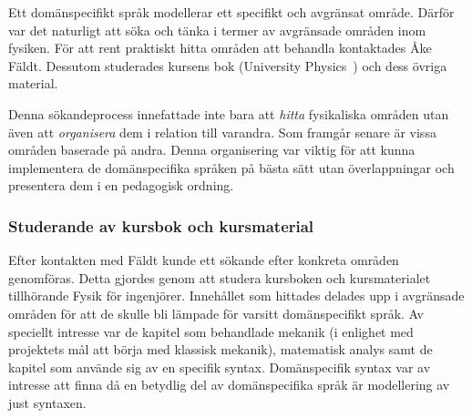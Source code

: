 Ett domänspecifikt språk modellerar ett specifikt och avgränsat område. Därför
var det naturligt att söka och tänka i termer av avgränsade områden inom
fysiken.
För att rent praktiskt hitta områden att behandla kontaktades Åke
Fäldt. Dessutom studerades kursens bok (University
Physics~\cite{UP}) och dess övriga material.

Denna sökandeprocess innefattade inte bara att \textit{hitta} fysikaliska
områden utan även att \textit{organisera} dem i relation till varandra. Som framgår
senare är vissa områden baserade på andra. Denna organisering
var viktig för att kunna implementera de domänspecifika språken på bästa sätt
utan överlappningar och presentera dem i en pedagogisk ordning.

%
%

\subsubsection*{Studerande av kursbok och kursmaterial}

Efter kontakten med Fäldt kunde ett sökande efter konkreta områden genomföras.
Detta gjordes genom att studera kursboken och kursmaterialet tillhörande Fysik
för ingenjörer. Innehållet som hittades delades upp i avgränsade områden för att
de skulle bli lämpade för varsitt domänspecifikt språk. Av speciellt intresse
var de kapitel som behandlade mekanik (i enlighet med projektets mål att börja
med klassisk mekanik), matematisk analys samt de kapitel som använde sig av en
specifik syntax. Domänspecifik syntax var av intresse att finna
då en betydlig del av domänspecifika språk är modellering av just syntaxen.

